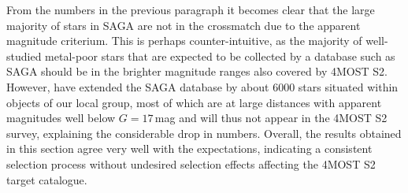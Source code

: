 \documentclass[a4paper,11pt]{article}
\begin{document}
%
From the numbers in the previous paragraph it becomes clear that the large majority of stars in SAGA are not in the crossmatch due to the apparent magnitude criterium. This is perhaps counter-intuitive, as the majority of well-studied metal-poor stars that are expected to be collected by a database such as SAGA should be in the brighter magnitude ranges also covered by 4MOST S2. However, \citet{suda17} have extended the SAGA database by about 6000 stars situated within objects of our local group, most of which are at large distances with apparent magnitudes well below $G=17$\,mag and will thus not appear in the 4MOST S2 survey, explaining the considerable drop in numbers. Overall, the results obtained in this section agree very well with the expectations, indicating a consistent selection process without undesired selection effects affecting the 4MOST S2 target catalogue.
%
\end{document}

